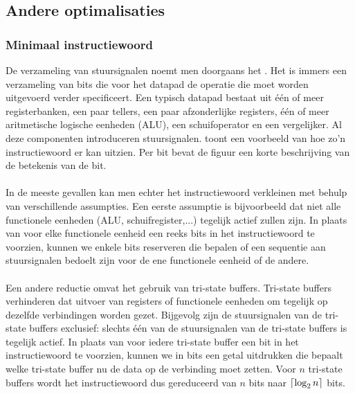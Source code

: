 \subsection{Andere optimalisaties}
\label{ss:syntheseFSMDOptimal}
\subsubsection{Minimaal instructiewoord}
De verzameling van stuursignalen noemt men doorgaans het . Het is immers een verzameling van bits die voor het datapad de operatie die moet worden uitgevoerd verder specificeert. Een typisch datapad bestaat uit \'e\'en of meer registerbanken, een paar tellers, een paar afzonderlijke registers, \'e\'en of meer aritmetische logische eenheden (ALU), een schuifoperator en een vergelijker. Al deze componenten introduceren stuursignalen.  toont een voorbeeld van hoe zo'n instructiewoord er kan uitzien. Per bit bevat de figuur een korte beschrijving van de betekenis van de bit.
\paragraph{}
In de meeste gevallen kan men echter het instructiewoord verkleinen met behulp van verschillende assumpties. Een eerste assumptie is bijvoorbeeld dat niet alle functionele eenheden (ALU, schuifregister,...) tegelijk actief zullen zijn. In plaats van voor elke functionele eenheid een reeks bits in het instructiewoord te voorzien, kunnen we enkele bits reserveren die bepalen of een sequentie aan stuursignalen bedoelt zijn voor de ene functionele eenheid of de andere.
\paragraph{}
Een andere reductie omvat het gebruik van tri-state buffers. Tri-state buffers verhinderen dat uitvoer van registers of functionele eenheden om tegelijk op dezelfde verbindingen worden gezet. Bijgevolg zijn de stuursignalen van de tri-state buffers exclusief: slechts \'e\'en van de stuursignalen van de tri-state buffers is tegelijk actief. In plaats van voor iedere tri-state buffer een bit in het instructiewoord te voorzien, kunnen we in bits een getal uitdrukken die bepaalt welke tri-state buffer nu de data op de verbinding moet zetten. Voor $n$ tri-state buffers wordt het instructiewoord dus gereduceerd van $n$ bits naar $\left\lceil \log_2n \right\rceil$ bits.
